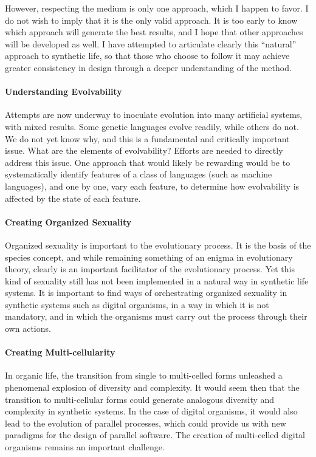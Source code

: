 However, respecting the medium is only one approach, which I happen to
favor.  I do not wish to imply that it is the only valid approach.  It
is too early to know which approach will generate the best results,
and I hope that other approaches will be developed as well.  I have
attempted to articulate clearly this ``natural'' approach to synthetic
life, so that those who choose to follow it may achieve greater
consistency in design through a deeper understanding of the method.

\paragraph{Understanding Evolvability}

Attempts are now underway to inoculate evolution into many artificial
systems, with mixed results.  Some genetic languages evolve readily,
while others do not.  We do not yet know why, and this is a fundamental
and critically important issue.  What are the elements of evolvability?
Efforts are needed to directly address this issue.  One approach that
would likely be rewarding would be to systematically identify features
of a class of languages (such as machine languages), and one by one,
vary each feature, to determine how evolvability is affected by the
state of each feature.

\paragraph{Creating Organized Sexuality}

Organized sexuality is important to the evolutionary process.  It is
the basis of the species concept, and while remaining something of
an enigma in evolutionary theory, clearly is an important facilitator
of the evolutionary process.  Yet this kind of sexuality still has not
been implemented in a natural way in synthetic life systems.  It is
important to find ways of orchestrating organized sexuality in synthetic
systems such as digital organisms, in a way in which it is not mandatory,
and in which the organisms must carry out the process through their
own actions.

\paragraph{Creating Multi-cellularity}

In organic life, the transition from single to multi-celled forms
unleashed a phenomenal explosion of diversity and complexity.  It would
seem then that the transition to multi-cellular forms could generate
analogous diversity and complexity in synthetic systems.  In the case
of digital organisms, it would also lead to the evolution of parallel
processes, which could provide us with new paradigms for the design of
parallel software.  The creation of multi-celled digital organisms
remains an important challenge.

